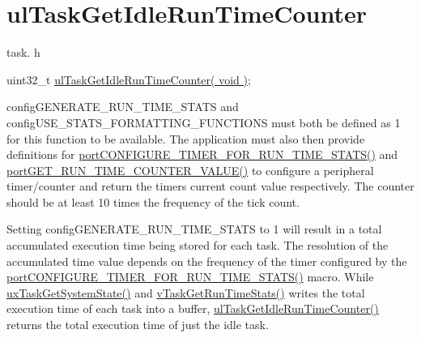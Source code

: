 \hypertarget{group__ul_task_get_idle_run_time_counter}{}\section{ul\+Task\+Get\+Idle\+Run\+Time\+Counter}
\label{group__ul_task_get_idle_run_time_counter}
task. h 
\begin{DoxyPre}uint32\_t \hyperlink{externals_2freertos_2include_2task_8h_aa3d1466d43c0263448661e91681e4a9a}{ulTaskGetIdleRunTimeCounter( void )};\end{DoxyPre}


config\+G\+E\+N\+E\+R\+A\+T\+E\+\_\+\+R\+U\+N\+\_\+\+T\+I\+M\+E\+\_\+\+S\+T\+A\+TS and config\+U\+S\+E\+\_\+\+S\+T\+A\+T\+S\+\_\+\+F\+O\+R\+M\+A\+T\+T\+I\+N\+G\+\_\+\+F\+U\+N\+C\+T\+I\+O\+NS must both be defined as 1 for this function to be available. The application must also then provide definitions for \hyperlink{externals_2freertos_2include_2_free_r_t_o_s_8h_a727939bcdb98501e0eba0ec8a1841e1b}{port\+C\+O\+N\+F\+I\+G\+U\+R\+E\+\_\+\+T\+I\+M\+E\+R\+\_\+\+F\+O\+R\+\_\+\+R\+U\+N\+\_\+\+T\+I\+M\+E\+\_\+\+S\+T\+A\+T\+S()} and \hyperlink{externals_2freertos_2portable_2_third_party_2_g_c_c_2_posix_2portmacro_8h_aa7cb8c79fb40bf2d4caccf5ba9ae6737}{port\+G\+E\+T\+\_\+\+R\+U\+N\+\_\+\+T\+I\+M\+E\+\_\+\+C\+O\+U\+N\+T\+E\+R\+\_\+\+V\+A\+L\+U\+E()} to configure a peripheral timer/counter and return the timers current count value respectively. The counter should be at least 10 times the frequency of the tick count.

Setting config\+G\+E\+N\+E\+R\+A\+T\+E\+\_\+\+R\+U\+N\+\_\+\+T\+I\+M\+E\+\_\+\+S\+T\+A\+TS to 1 will result in a total accumulated execution time being stored for each task. The resolution of the accumulated time value depends on the frequency of the timer configured by the \hyperlink{externals_2freertos_2include_2_free_r_t_o_s_8h_a727939bcdb98501e0eba0ec8a1841e1b}{port\+C\+O\+N\+F\+I\+G\+U\+R\+E\+\_\+\+T\+I\+M\+E\+R\+\_\+\+F\+O\+R\+\_\+\+R\+U\+N\+\_\+\+T\+I\+M\+E\+\_\+\+S\+T\+A\+T\+S()} macro. While \hyperlink{externals_2freertos_2include_2task_8h_aa4603f3de3d809e9beb18d10fbac005d}{ux\+Task\+Get\+System\+State()} and \hyperlink{externals_2freertos_2include_2task_8h_a52da9b427041a48dc9f6802e10f151d4}{v\+Task\+Get\+Run\+Time\+Stats()} writes the total execution time of each task into a buffer, \hyperlink{externals_2freertos_2include_2task_8h_aa3d1466d43c0263448661e91681e4a9a}{ul\+Task\+Get\+Idle\+Run\+Time\+Counter()} returns the total execution time of just the idle task.

